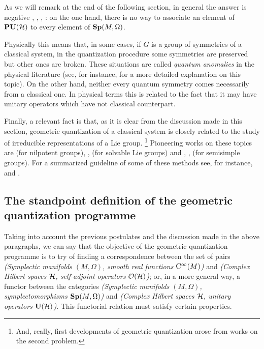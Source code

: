 \documentclass[12pt]{article}
\def\H{{\cal H}}
\def\Cinfty{{\rm C}^\infty}
\begin{document}
As we will remark at the end of the following section, in general the
answer is negative
\cite{AM-78}, \cite{Go-80}, \cite{Gr-46}, \cite{Vh-51}:
on the one hand, there is no way to associate
an element of ${\bf PU}(\H )$ to every element of ${\bf Sp}(M,\Omega )$.

Physically this means that, in some cases,
if $G$ is a group of symmetries of a classical system,
in the quantization procedure some symmetries are preserved
but other ones are broken. These situations are called
{\it quantum anomalies} in the physical literature
(see, for instance, \cite{GS-dggt} for a more detailed explanation on
this topic).
On the other hand, neither every quantum symmetry
comes necessarily from a classical one.
In physical terms this is related to the fact that it may have
unitary operators which have not classical counterpart.

Finally, a relevant fact is that, as it is clear from the discussion
made in this section,
geometric quantization of a classical system is closely related to the
study of irreducible
representations of a Lie group.%
\footnote{
And, really, first developments of geometric quantization
arose from works on the second problem.}
Pioneering works on these topics are \cite{Ki-62} (for nilpotent
groups),
\cite{AK-71}, \cite{Be-rglr} (for solvable Lie groups)
and \cite{Bl-73}, \cite{Bl-77}, \cite{RW-rsg} (for semisimple groups).
For a summarized guideline of some of these methods see,
for instance, \cite{Ki-gq} and \cite{Wn-77}.



\subsection{The standpoint definition of the
            geometric quantization programme}



Taking into account the previous postulates and the discussion
made in the above paragraphs, we can say that
the objective of the geometric quantization programme
is to try of finding a correspondence between the set of pairs
{\it (Symplectic manifolds $(M,\Omega )$,  smooth real functions
$\Cinfty (M)$)}
and {\it (Complex Hilbert spaces $\H$, self-adjoint operators ${\cal
O}(\H )$)};
or, in a more general way, a functor between the categories
{\it (Symplectic manifolds $(M,\Omega )$, symplectomorphisms ${\bf
Sp}(M,\Omega )$)}
and {\it (Complex Hilbert spaces $\H$, unitary operators ${\bf U}(\H
)$)}.
This functorial relation must satisfy certain properties.
\end{document}
